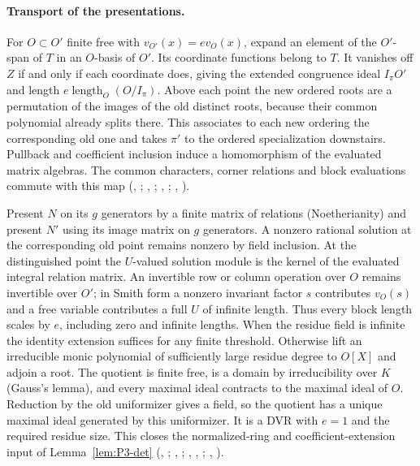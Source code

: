 \paragraph{Transport of the presentations.}
For $O\subset O'$ finite free with $v_{O'}(x)=e v_O(x)$, expand an
element of the $O'$-span of $T$ in an $O$-basis of $O'$. Its coordinate
functions belong to $T$. It vanishes off $Z$ if and only if each
coordinate does, giving the extended congruence ideal $I_\pi O'$ and
length $e\operatorname{length}_O(O/I_\pi)$. Above each point the new
ordered roots are a permutation of the images of the old distinct roots,
because their common polynomial already splits there. This associates to
each new ordering the corresponding old one and takes $\pi'$ to the
ordered specialization downstairs. Pullback and coefficient inclusion
induce a homomorphism of the evaluated matrix algebras. The common
characters, corner relations and block evaluations commute with this map
(, ;
, ;
, ;
, ).

Present $N$ on its $g$ generators by a finite matrix of relations
(Noetherianity) and present $N'$ using its image matrix on $g$
generators. A nonzero rational solution at the corresponding old point
remains nonzero by field inclusion. At the distinguished point the
$U$-valued solution module is the kernel of the evaluated integral
relation matrix. An invertible row or column operation over $O$ remains
invertible over $O'$; in Smith form a nonzero invariant factor $s$
contributes $v_O(s)$ and a free variable contributes a full $U$ of
infinite length. Thus every block length scales by $e$, including zero
and infinite lengths. When the residue field is infinite the identity
extension suffices for any finite threshold. Otherwise lift an irreducible
monic polynomial of sufficiently large residue degree to $O[X]$ and
adjoin a root. The quotient is finite free, is a domain by irreducibility
over $K$ (Gauss's lemma), and every maximal ideal contracts to the
maximal ideal of $O$. Reduction by the old uniformizer gives a field,
so the quotient has a unique maximal ideal generated by this
uniformizer. It is a DVR with $e=1$ and the required residue size.
This closes the normalized-ring and coefficient-extension input of
Lemma~\ref{lem:P3-det}
(, ;
, ;
, , ;
,
).

